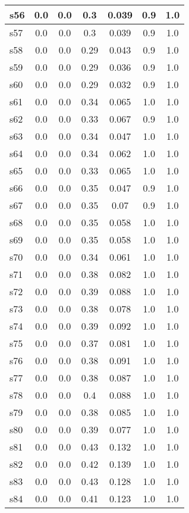 \documentclass{article}
\begin{document}
\begin{tabular}{|l|c|c|c|c|c|c|}
\hline
s56 &0.0 & 0.0 & 0.3 & 0.039 & 0.9 & 1.0\\
\hline
s57 &0.0 & 0.0 & 0.3 & 0.039 & 0.9 & 1.0\\
\hline
s58 &0.0 & 0.0 & 0.29 & 0.043 & 0.9 & 1.0\\
\hline
s59 &0.0 & 0.0 & 0.29 & 0.036 & 0.9 & 1.0\\
\hline
s60 &0.0 & 0.0 & 0.29 & 0.032 & 0.9 & 1.0\\
\hline
s61 &0.0 & 0.0 & 0.34 & 0.065 & 1.0 & 1.0\\
\hline
s62 &0.0 & 0.0 & 0.33 & 0.067 & 0.9 & 1.0\\
\hline
s63 &0.0 & 0.0 & 0.34 & 0.047 & 1.0 & 1.0\\
\hline
s64 &0.0 & 0.0 & 0.34 & 0.062 & 1.0 & 1.0\\
\hline
s65 &0.0 & 0.0 & 0.33 & 0.065 & 1.0 & 1.0\\
\hline
s66 &0.0 & 0.0 & 0.35 & 0.047 & 0.9 & 1.0\\
\hline
s67 &0.0 & 0.0 & 0.35 & 0.07 & 0.9 & 1.0\\
\hline
s68 &0.0 & 0.0 & 0.35 & 0.058 & 1.0 & 1.0\\
\hline
s69 &0.0 & 0.0 & 0.35 & 0.058 & 1.0 & 1.0\\
\hline
s70 &0.0 & 0.0 & 0.34 & 0.061 & 1.0 & 1.0\\
\hline
s71 &0.0 & 0.0 & 0.38 & 0.082 & 1.0 & 1.0\\
\hline
s72 &0.0 & 0.0 & 0.39 & 0.088 & 1.0 & 1.0\\
\hline
s73 &0.0 & 0.0 & 0.38 & 0.078 & 1.0 & 1.0\\
\hline
s74 &0.0 & 0.0 & 0.39 & 0.092 & 1.0 & 1.0\\
\hline
s75 &0.0 & 0.0 & 0.37 & 0.081 & 1.0 & 1.0\\
\hline
s76 &0.0 & 0.0 & 0.38 & 0.091 & 1.0 & 1.0\\
\hline
s77 &0.0 & 0.0 & 0.38 & 0.087 & 1.0 & 1.0\\
\hline
s78 &0.0 & 0.0 & 0.4 & 0.088 & 1.0 & 1.0\\
\hline
s79 &0.0 & 0.0 & 0.38 & 0.085 & 1.0 & 1.0\\
\hline
s80 &0.0 & 0.0 & 0.39 & 0.077 & 1.0 & 1.0\\
\hline
s81 &0.0 & 0.0 & 0.43 & 0.132 & 1.0 & 1.0\\
\hline
s82 &0.0 & 0.0 & 0.42 & 0.139 & 1.0 & 1.0\\
\hline
s83 &0.0 & 0.0 & 0.43 & 0.128 & 1.0 & 1.0\\
\hline
s84 &0.0 & 0.0 & 0.41 & 0.123 & 1.0 & 1.0\\

\end{tabular}
\end{document}
